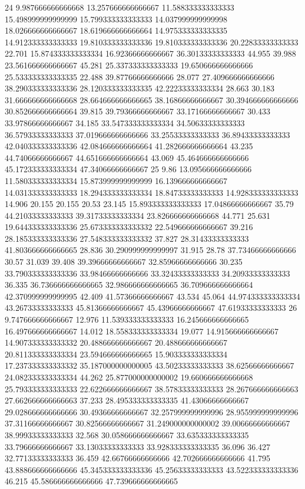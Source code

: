 24 9.987666666666668 13.257666666666667 11.588333333333333 15.498999999999999 15.799333333333333 14.037999999999998 18.026666666666667 18.619666666666664 14.975333333333335 14.912333333333333 19.810333333333336 19.810333333333336 20.22833333333333 22.701 15.874333333333334 16.92366666666667 36.30133333333333 44.955 39.988 23.561666666666667 45.281 25.337333333333333 19.650666666666666 25.533333333333335 22.488 39.87766666666666 28.077 27.409666666666666 38.290333333333336 28.120333333333335 42.22233333333334 28.663 30.183 31.666666666666668 28.664666666666665 38.16866666666667 30.394666666666666 30.852666666666664 39.815 39.79366666666667 33.17166666666667 30.433 33.97866666666667 34.185 33.547333333333334 34.50633333333333 36.57933333333333 37.019666666666666 33.25533333333333 36.89433333333333 42.040333333333336 42.084666666666664 41.282666666666664 43.235 44.74066666666667 44.651666666666664 43.069 45.464666666666666 45.172333333333334 47.34066666666667
25 9.86 13.095666666666666 11.580333333333334 15.873999999999999 16.139666666666667 14.031333333333333 18.294333333333334 18.84733333333333 14.928333333333333 14.906 20.155 20.155 20.53 23.145 15.893333333333333 17.04866666666667 35.79 44.21033333333333 39.31733333333334 23.826666666666668 44.771 25.631 19.644333333333336 25.673333333333332 22.549666666666667 39.216 28.185333333333336 27.548333333333332 37.827 28.31433333333333 41.803666666666665 28.836 30.290999999999997 31.915 28.78 37.73466666666666 30.57 31.039 39.408 39.39666666666667 32.85966666666666 30.235 33.790333333333336 33.98466666666666 33.32433333333333 34.20933333333333 36.335 36.736666666666665 32.986666666666665 36.709666666666664 42.370999999999995 42.409 41.57366666666667 43.534 45.064 44.974333333333334 43.26733333333333 45.81366666666667 45.43966666666667 47.61933333333333
26 9.747666666666667 12.976 11.539333333333333 16.245666666666665 16.497666666666667 14.012 18.558333333333334 19.077 14.915666666666667 14.907333333333332 20.488666666666667 20.488666666666667 20.811333333333334 23.594666666666665 15.903333333333334 17.237333333333332 35.187000000000005 43.50233333333333 38.62566666666667 24.082333333333334 44.262 25.877000000000002 19.660666666666668 25.793333333333333 22.622666666666667 38.57833333333333 28.267666666666663 27.662666666666663 37.233 28.495333333333335 41.43066666666667 29.028666666666666 30.49366666666667 32.257999999999996 28.955999999999996 37.31166666666667 30.82566666666667 31.249000000000002 39.00666666666667 38.99933333333333 32.568 30.058666666666667 33.635333333333335 33.79666666666667 33.13033333333333 33.928333333333335 36.096 36.427 32.77133333333333 36.459 42.66766666666666 42.702666666666666 41.795 43.888666666666666 45.345333333333336 45.25633333333333 43.522333333333336 46.215 45.586666666666666 47.739666666666665
